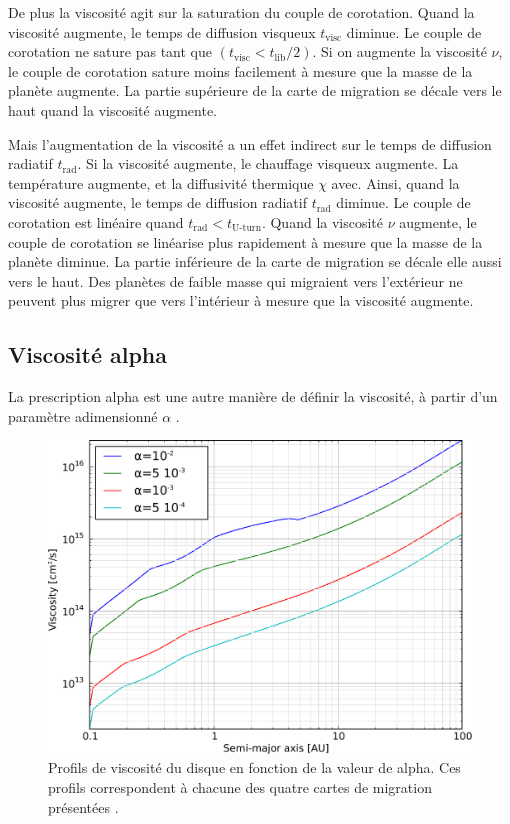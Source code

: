 De plus la viscosité agit sur la saturation du couple de corotation.
Quand la viscosité augmente, le temps de diffusion visqueux $t_\text{visc}$ diminue. Le couple de corotation ne sature pas tant
que $(t_\text{visc} < t_\text{lib}/2)$. Si on augmente la viscosité $\nu$, le couple de corotation sature moins facilement à
mesure que la masse de la planète augmente. La partie supérieure de la carte de migration se décale vers le haut quand la
viscosité augmente. 

Mais l'augmentation de la viscosité a un effet indirect sur le temps de diffusion radiatif $t_\text{rad}$. Si la viscosité augmente, le chauffage visqueux augmente. La température augmente, et la diffusivité thermique $\chi$ avec. Ainsi, quand la viscosité augmente, le temps de diffusion radiatif $t_\text{rad}$ diminue. Le couple de corotation est linéaire quand $t_\text{rad} < t_\text{U-turn}$. Quand la viscosité $\nu$ augmente, le couple de corotation se linéarise plus rapidement à mesure que la masse de la planète diminue. La partie inférieure de la carte de migration se décale elle aussi vers le haut. Des planètes de faible masse qui migraient vers l'extérieur ne peuvent plus migrer que vers l'intérieur à mesure que la viscosité augmente. 

\subsection{Viscosité alpha}
La prescription alpha \citep{shakura1973black} est une autre manière de définir la viscosité, à partir d'un paramètre adimensionné $\alpha$ .

\begin{figure}[htbp]
\centering
\includegraphics[width=0.6\linewidth]{figure/migration_map/viscosity/alpha_profiles.pdf}
\caption{Profils de viscosité du disque en fonction de la valeur de alpha. Ces profils correspondent à chacune des quatre cartes de migration
présentées \protect{}. }\label{fig:alpha_profiles}
\end{figure}

